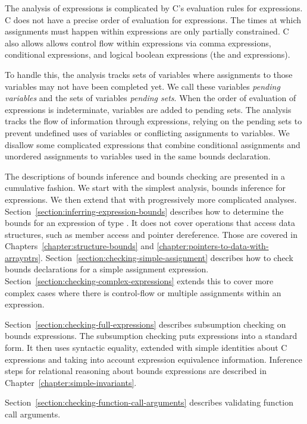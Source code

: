 The analysis of expressions is complicated by C's evaluation
rules for expressions.  C does not have a precise order of evaluation
for expressions.  The times at which assignments
must happen within expressions are only partially constrained.
C also allows allows control flow within 
expressions via comma expressions, conditional expressions, and
logical boolean expressions (the \code{&&} and \code{||} expressions).

To handle this, the analysis tracks sets of variables where assignments
to those variables may not have been completed yet.  We call these
variables {\em pending variables} and the sets of variables {\em
pending sets}.  When the order of evaluation of expressions
is indeterminate, variables are added to pending sets.
The analysis tracks the flow of information through expressions, relying on the
pending sets to prevent undefined uses of variables or conflicting
assignments to variables.  We disallow some complicated expressions
that combine conditional assignments and unordered assignments
to variables used in the same bounds declaration.

The descriptions of bounds inference and bounds checking are
presented in a cumulative fashion.  We start with the simplest
analysis, bounds inference for expressions.  We then extend that
with progressively more complicated analyses.
Section~\ref{section:inferring-expression-bounds}
describes how to determine the bounds for an expression of type \arrayptr.
It does not cover operations that access data structures, such as member
access and pointer dereference. 
Those are covered in Chapters~\ref{chapter:structure-bounds} and 
\ref{chapter:pointers-to-data-with-arrayptrs}.
Section~\ref{section:checking-simple-assignment} describes
how to check bounds declarations for a simple assignment
expression.
Section~\ref{section:checking-complex-expressions}
extends this to cover more complex cases where there is control-flow
or multiple assignments within an expression.

Section~\ref{section:checking-full-expressions} describes
subsumption checking on bounds expressions.   The subsumption checking
puts expressions into a standard form.  It then uses syntactic equality,
extended with simple identities about C expressions and taking into account expression
equivalence information.
Inference steps for relational reasoning about bounds expressions 
are described in Chapter~\ref{chapter:simple-invariants}.

Section~\ref{section:checking-function-call-arguments}
describes validating function call arguments.

